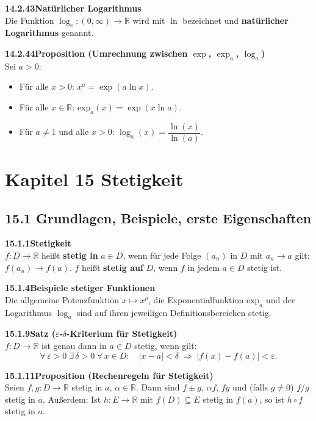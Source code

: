 \documentclass[a4paper,12pt]{article}
\newcommand{\gentry}[3]{%
  \noindent\textbf{#1\quad #2}\nopagebreak\\[0.2em]
  #3\par\smallskip
}
\begin{document}
\gentry{14.2.43}{Natürlicher Logarithmus}{%
  Die Funktion $\log_e: (0,\infty) \to \mathbb{R}$ wird mit $\ln$ bezeichnet und
  \textbf{natürlicher Logarithmus} genannt.
}

\gentry{14.2.44}{Proposition (Umrechnung zwischen $\exp$, $\exp_a$, $\log_a$)}{%
  Sei $a > 0$:
  \begin{itemize}[topsep=2pt,itemsep=1pt]
    \item Für alle $x > 0$: $x^a = \exp(a \ln x)$.
    \item Für alle $x \in \mathbb{R}$: $\mathrm{exp}_a(x) = \exp(x \ln a)$.
    \item Für $a \neq 1$ und alle $x > 0$: $\log_a(x) = \dfrac{\ln(x)}{\ln(a)}$.
  \end{itemize}
}

\section*{Kapitel 15 \quad Stetigkeit}

\subsection*{15.1 \quad Grundlagen, Beispiele, erste Eigenschaften}

\gentry{15.1.1}{Stetigkeit}{%
  $f: D \to \mathbb{R}$ heißt \textbf{stetig in} $a \in D$, wenn für jede Folge
  $(a_n)$ in $D$ mit $a_n \to a$ gilt: $f(a_n) \to f(a)$.
  $f$ heißt \textbf{stetig auf} $D$, wenn $f$ in jedem $a \in D$ stetig ist.
}

\gentry{15.1.4}{Beispiele stetiger Funktionen}{%
  Die allgemeine Potenzfunktion $x \mapsto x^\rho$, die Exponentialfunktion
  $\mathrm{exp}_a$ und der Logarithmus $\log_a$ sind auf ihren jeweiligen
  Definitionsbereichen stetig.
}

\gentry{15.1.9}{Satz ($\varepsilon$-$\delta$-Kriterium für Stetigkeit)}{%
  $f: D \to \mathbb{R}$ ist genau dann in $a \in D$ stetig, wenn gilt:
  \[
    \forall\, \varepsilon > 0 \;\exists\, \delta > 0 \;\forall\, x \in D:
    \quad |x - a| < \delta \;\Rightarrow\; |f(x) - f(a)| < \varepsilon.
  \]
}

\gentry{15.1.11}{Proposition (Rechenregeln für Stetigkeit)}{%
  Seien $f, g: D \to \mathbb{R}$ stetig in $a$, $\alpha \in \mathbb{R}$.
  Dann sind $f \pm g$, $\alpha f$, $fg$ und (falls $g \neq 0$) $f/g$ stetig in $a$.
  Außerdem: Ist $h: E \to \mathbb{R}$ mit $f(D) \subseteq E$ stetig in $f(a)$,
  so ist $h \circ f$ stetig in $a$.
}
\end{document}
